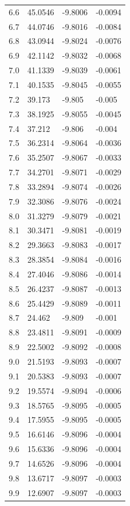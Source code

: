 \begin{tabular}{llll}
6.6 & 45.0546 & -9.8006 & -0.0094 \\
6.7 & 44.0746 & -9.8016 & -0.0084 \\
6.8 & 43.0944 & -9.8024 & -0.0076 \\
6.9 & 42.1142 & -9.8032 & -0.0068 \\
7.0 & 41.1339 & -9.8039 & -0.0061 \\
7.1 & 40.1535 & -9.8045 & -0.0055 \\
7.2 & 39.173 & -9.805 & -0.005 \\
7.3 & 38.1925 & -9.8055 & -0.0045 \\
7.4 & 37.212 & -9.806 & -0.004 \\
7.5 & 36.2314 & -9.8064 & -0.0036 \\
7.6 & 35.2507 & -9.8067 & -0.0033 \\
7.7 & 34.2701 & -9.8071 & -0.0029 \\
7.8 & 33.2894 & -9.8074 & -0.0026 \\
7.9 & 32.3086 & -9.8076 & -0.0024 \\
8.0 & 31.3279 & -9.8079 & -0.0021 \\
8.1 & 30.3471 & -9.8081 & -0.0019 \\
8.2 & 29.3663 & -9.8083 & -0.0017 \\
8.3 & 28.3854 & -9.8084 & -0.0016 \\
8.4 & 27.4046 & -9.8086 & -0.0014 \\
8.5 & 26.4237 & -9.8087 & -0.0013 \\
8.6 & 25.4429 & -9.8089 & -0.0011 \\
8.7 & 24.462 & -9.809 & -0.001 \\
8.8 & 23.4811 & -9.8091 & -0.0009 \\
8.9 & 22.5002 & -9.8092 & -0.0008 \\
9.0 & 21.5193 & -9.8093 & -0.0007 \\
9.1 & 20.5383 & -9.8093 & -0.0007 \\
9.2 & 19.5574 & -9.8094 & -0.0006 \\
9.3 & 18.5765 & -9.8095 & -0.0005 \\
9.4 & 17.5955 & -9.8095 & -0.0005 \\
9.5 & 16.6146 & -9.8096 & -0.0004 \\
9.6 & 15.6336 & -9.8096 & -0.0004 \\
9.7 & 14.6526 & -9.8096 & -0.0004 \\
9.8 & 13.6717 & -9.8097 & -0.0003 \\
9.9 & 12.6907 & -9.8097 & -0.0003 \\

\end{tabular}
